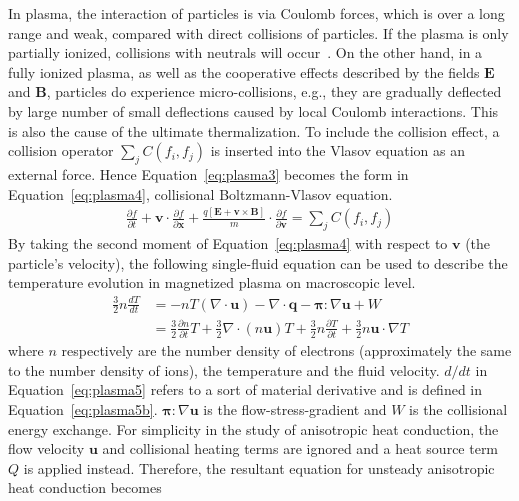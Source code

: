 \documentclass[runningheads]{llncs}
\begin{document}
In plasma, the interaction of particles is via Coulomb forces, which is over a long range and weak, compared with direct collisions of particles. If the plasma is only partially ionized, collisions with neutrals will occur~\cite{dendy1995plasma}. On the other hand, in a fully ionized plasma, as well as the cooperative effects described by the fields $\bm{E}$ and $\bm{B}$, particles do experience micro-collisions, e.g., they are gradually deflected by large number of small deflections caused by local Coulomb interactions. This is also the cause of the ultimate thermalization. To include the collision effect, a collision operator $\sum_j C(f_i, f_j)$ is inserted into the Vlasov equation as an external force. Hence Equation~\eqref{eq:plasma3} becomes the form in Equation~\eqref{eq:plasma4}, collisional Boltzmann-Vlasov equation. 
\begin{eqnarray}
\frac{\partial f}{\partial t} + \bm{v}\cdot \frac{\partial f}{\partial \bm{x}} + \frac{q[\bm{E}+\bm{v}\times \bm{B}]}{m}\cdot \frac{\partial f}{\partial \bm{v}} = \sum_j C(f_i, f_j) \label{eq:plasma4}
\end{eqnarray} 
By taking the second moment of Equation~\eqref{eq:plasma4} with respect to $\bm{v}$ (the particle's velocity), the following single-fluid equation can be used to describe the temperature evolution in magnetized plasma on macroscopic level.   
\begin{subequations}
	\begin{align}
	\frac{3}{2} n \frac{d T}{d t} &= -n T(\nabla \cdot \bm{u}) - \nabla \cdot \bm{q} - \bm{\pi} : \nabla \bm{u} + W \label{eq:plasma5} \\
	&= \frac{3}{2}\frac{\partial n}{\partial t}T + \frac{3}{2}\nabla\cdot(n\bm{u})T + \frac{3}{2} n \frac{\partial T}{\partial t} + \frac{3}{2} n \bm{u} \cdot \nabla T \label{eq:plasma5b}
	\end{align}
\end{subequations}  
where $n$ respectively are the number density of electrons (approximately the same to the number density of ions), the temperature and the fluid velocity. $d/dt$ in Equation~\eqref{eq:plasma5} refers to a sort of material derivative and is defined in Equation~\eqref{eq:plasma5b}. $\bm{\pi}: \nabla \bm{u}$ is the flow-stress-gradient and $W$ is the collisional energy exchange. For simplicity in the study of anisotropic heat conduction, the flow velocity $\bm{u}$ and collisional heating terms are ignored and a heat source term $Q$ is applied instead. Therefore, the resultant equation for unsteady anisotropic heat conduction becomes
\end{document}
